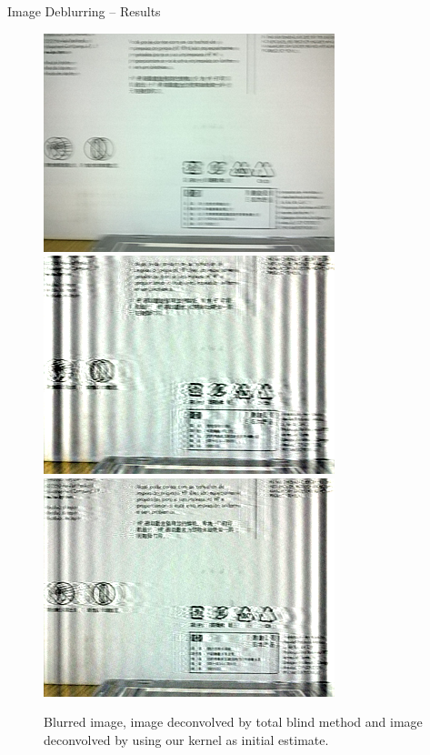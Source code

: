 \documentclass{beamer}
\begin{document}
\begin{frame}{Image Deblurring -- Results}
\begin{figure}[H]
\begin{center}
\resizebox{20mm}{!} {\includegraphics {../images/semiblind/blurred.png}}
\resizebox{20mm}{!} {\includegraphics {../images/semiblind/blind.png}}
\resizebox{20mm}{!} {\includegraphics {../images/semiblind/semi_blind.png}}
\caption{Blurred image, image deconvolved by total blind method and image 
deconvolved by using our kernel as initial estimate.}
\end{center}
\end{figure}

\end{frame}
\end{document}
